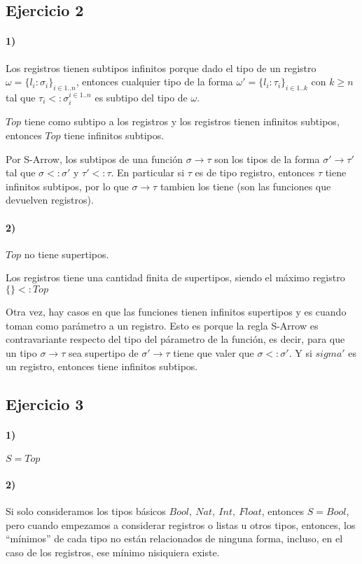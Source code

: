 \documentclass[10pt,a4paper, landscape]{article}
\begin{document}
	\begin{multicols}{2}
	\subsection{Ejercicio 2}
		\paragraph{1)} Los registros tienen subtipos infinitos porque dado el tipo de un registro $\omega = \{l_i:\sigma_i\}_{i\in 1..n}$, entonces cualquier tipo de la forma $\omega' = \{l_i:\tau_i\}_{i\in 1..k}$ con $k \geq n$ tal que  $\tau_i <: \sigma_i^{i\in 1..n}$ es subtipo del tipo de $\omega$.
		
		$Top$ tiene como subtipo a los registros y los registros tienen infinitos subtipos, entonces $Top$ tiene infinitos subtipos.
		
		Por S-Arrow, los subtipos de una función $\sigma\to\tau$ son los tipos de la forma $\sigma' \to \tau'$ tal que $\sigma <: \sigma'$ y $\tau' <: \tau$. En particular si $\tau$ es de tipo registro, entonces $\tau$ tiene infinitos subtipos, por lo que $\sigma\to\tau$ tambien los tiene (son las funciones que devuelven registros). 
		
		\paragraph{2)} $Top$ no tiene supertipos.
		
		Los registros tiene una cantidad finita de supertipos, siendo el máximo registro $\{\} <: Top$
		
		Otra vez, hay casos en que las funciones tienen infinitos supertipos y es cuando toman como parámetro a un registro. Esto es porque la regla S-Arrow es contravariante respecto del tipo del párametro de la función, es decir, para que un tipo $\sigma\to\tau$ sea supertipo de $\sigma'\to\tau$ tiene que valer que $\sigma <: \sigma'$. Y si $sigma'$ es un registro, entonces tiene infinitos subtipos.
		
		\vfill\null
		\columnbreak
		\subsection{Ejercicio 3}
		
		\paragraph{1)} $S = Top$
		\paragraph{2)} Si solo consideramos los tipos básicos $Bool,~Nat,~Int,~Float$, entonces $S=Bool$, pero cuando empezamos a considerar registros o listas u otros tipos, entonces, los ``mínimos'' de cada tipo no están relacionados de ninguna forma, incluso, en el caso de los registros, ese mínimo nisiquiera existe.

\end{multicols}
\end{document}
